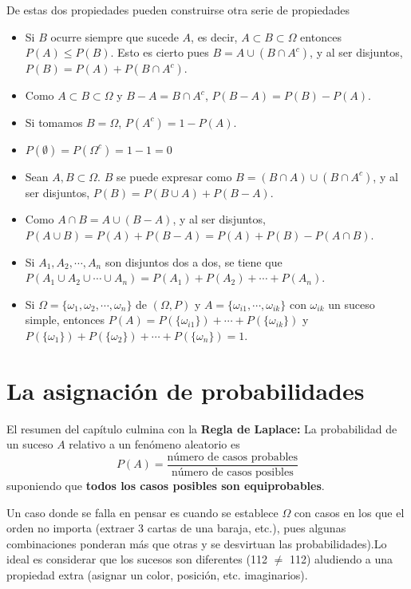 \documentclass[a4paper, 11pt]{extarticle}
\begin{document}
\begin{multicols*}{2}
De estas dos propiedades pueden construirse otra serie de propiedades
\begin{itemize}
\item Si \(B\) ocurre siempre que sucede \(A\), es decir, \(A \subset B \subset \Omega\) entonces \(P(A) \le P(B)\). Esto es cierto pues \(B = A \cup (B \cap
  A^c)\), y al ser disjuntos, \(P(B) = P(A) + P(B \cap A^c)\).
\item Como \(A \subset B \subset \Omega\) y \(B - A = B \cap A^c\), \(P(B-A) =
  P(B) - P(A)\).
\item Si tomamos \(B = \Omega\), \(P(A^c) = 1 - P(A)\).
\item \(P(\emptyset) = P(\Omega^c) = 1 - 1 = 0\)
\item Sean \(A, B \subset \Omega\). \(B\) se puede expresar como \(B = (B \cap
  A) \cup (B \cap A^c)\), y al ser disjuntos, \(P(B) = P(B \cup A) + P(B - A)\).
\item Como \(A \cap B = A \cup (B - A)\), y al ser disjuntos, \(P(A \cup B) =
  P(A) + P(B-A) = P(A) + P(B) - P(A \cap B)\).
\item Si \(A_1, A_2, \cdots, A_n\) son disjuntos dos a dos, se tiene que \(P(A_1
  \cup A_2 \cup \cdots \cup A_n) = P(A_1) + P(A_2) + \cdots + P(A_n)\).
\item Si \(\Omega = \{ \omega_1,\omega_2, \cdots, \omega_n \}\) de \((\Omega, P)\) y \(A = \{ \omega_{i1}, \cdots, \omega_{ik} \}\) con \(\omega_{ik}\) un
suceso simple, entonces \(P(A) = P(\{ \omega_{i1} \}) + \cdots + P(\{ \omega_{ik}
  \})\) y \(P(\{ \omega_1 \}) + P(\{ \omega_2 \}) + \cdots + P(\{ \omega_n
  \}) = 1\).
\end{itemize}
\vspace{-2.5em}
\section*{La asignación de probabilidades}
\label{sec:org2c51428}
\vspace{-1.5em}
El resumen del capítulo culmina con la \textbf{Regla de Laplace:}
La probabilidad de un suceso \(A\) relativo a un fenómeno aleatorio es
\[ P(A) = \frac{\text{número de casos probables}}{\text{número de casos
posibles}} \]
suponiendo que \textbf{todos los casos posibles son equiprobables}.

 Un caso donde se falla en pensar es cuando se establece 
\(\Omega\) con casos en los que el orden no importa (extraer 3 cartas de una
baraja, etc.), pues algunas combinaciones ponderan más
que otras y se desvirtuan las probabilidades).Lo ideal es considerar que los
 sucesos son diferentes (112 \(\neq\) 112) aludiendo a una propiedad extra (asignar un color, posición, etc.
imaginarios).
\vspace{-1.5em}

\end{multicols*}
\end{document}

